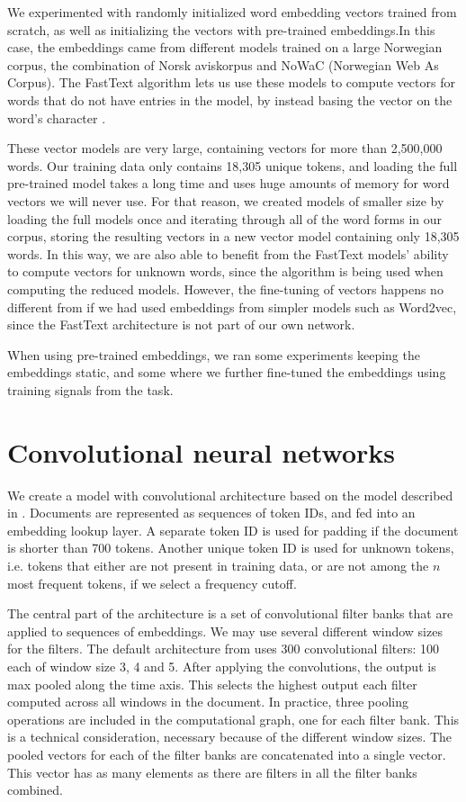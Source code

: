 We experimented with randomly initialized word embedding vectors trained from
scratch, as well as initializing the vectors with pre-trained embeddings.In
this case, the embeddings came from different models trained on a large
Norwegian corpus, the combination of Norsk aviskorpus and NoWaC (Norwegian
Web As Corpus). The FastText algorithm lets us use these models to compute
vectors for words that do not have entries in the model, by instead basing
the vector on the word's character \ngrams.

These vector models are very large, containing vectors for more than
2,500,000 words. Our training data only contains 18,305 unique tokens, and
loading the full pre-trained model takes a long time and uses huge amounts of
memory for word vectors we will never use. For that reason, we created models
of smaller size by loading the full models once and iterating through all of
the word forms in our corpus, storing the resulting vectors in a new vector
model containing only 18,305 words. In this way, we are also able to benefit
from the FastText models' ability to compute vectors for unknown words, since
the \ngram algorithm is being used when computing the reduced models.
However, the fine-tuning of vectors happens no different from if we had used
embeddings from simpler models such as Word2vec, since the FastText
architecture is not part of our own network.

When using pre-trained embeddings, we ran some experiments keeping the
embeddings static, and some where we further fine-tuned the embeddings using
training signals from the task.


\section{Convolutional neural networks}

We create a model with convolutional architecture based on the model
described in \textcite{kim2014convolutional}. Documents are represented as
sequences of token IDs, and fed into an embedding lookup layer. A separate
token ID is used for padding if the document is shorter than 700 tokens.
Another unique token ID is used for unknown tokens, i.e. tokens that either
are not present in training data, or are not among the $n$ most frequent
tokens, if we select a frequency cutoff.

The central part of the architecture is a set of convolutional filter banks
that are applied to sequences of embeddings. We may use several different
window sizes for the filters. The default architecture from
\textcite{kim2014convolutional} uses 300 convolutional filters: 100 each of
window size 3, 4 and 5. After applying the convolutions, the output is max
pooled along the time axis. This selects the highest output each filter
computed across all windows in the document. In practice, three pooling
operations are included in the computational graph, one for each filter bank.
This is a technical consideration, necessary because of the different window
sizes. The pooled vectors for each of the filter banks are concatenated into
a single vector. This vector has as many elements as there are filters in all
the filter banks combined.

